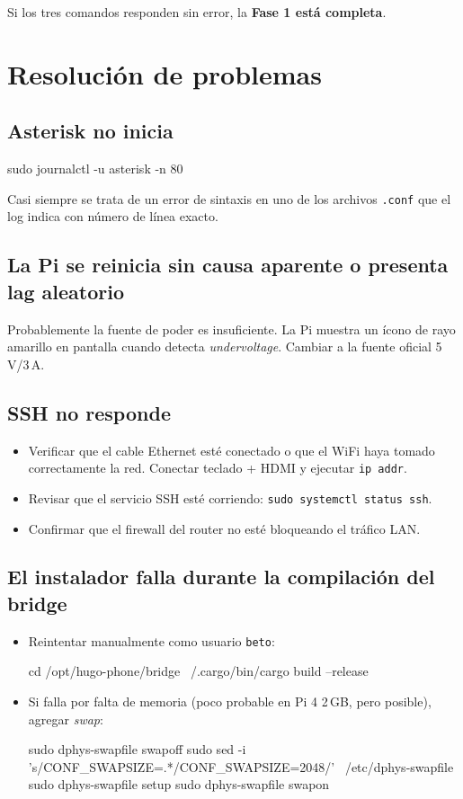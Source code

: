 Si los tres comandos responden sin error, la \textbf{Fase 1 está completa}.

\section{Resolución de problemas}

\subsection{Asterisk no inicia}

\begin{shellcode}
sudo journalctl -u asterisk -n 80
\end{shellcode}

Casi siempre se trata de un error de sintaxis en uno de los archivos \texttt{.conf} que el log indica con número de línea exacto.

\subsection{La Pi se reinicia sin causa aparente o presenta lag aleatorio}

Probablemente la fuente de poder es insuficiente. La Pi muestra un ícono de rayo amarillo en pantalla cuando detecta \emph{undervoltage}. Cambiar a la fuente oficial 5\,V/3\,A.

\subsection{SSH no responde}

\begin{itemize}
  \item Verificar que el cable Ethernet esté conectado o que el WiFi haya tomado correctamente la red. Conectar teclado + HDMI y ejecutar \texttt{ip addr}.
  \item Revisar que el servicio SSH esté corriendo: \texttt{sudo systemctl status ssh}.
  \item Confirmar que el firewall del router no esté bloqueando el tráfico LAN.
\end{itemize}

\subsection{El instalador falla durante la compilación del bridge}

\begin{itemize}
  \item Reintentar manualmente como usuario \texttt{beto}:
  \begin{shellcode}
cd /opt/hugo-phone/bridge
~/.cargo/bin/cargo build --release
  \end{shellcode}
  \item Si falla por falta de memoria (poco probable en Pi 4 2\,GB, pero posible), agregar \emph{swap}:
  \begin{shellcode}
sudo dphys-swapfile swapoff
sudo sed -i 's/CONF_SWAPSIZE=.*/CONF_SWAPSIZE=2048/' \
  /etc/dphys-swapfile
sudo dphys-swapfile setup
sudo dphys-swapfile swapon
  \end{shellcode}
\end{itemize}
